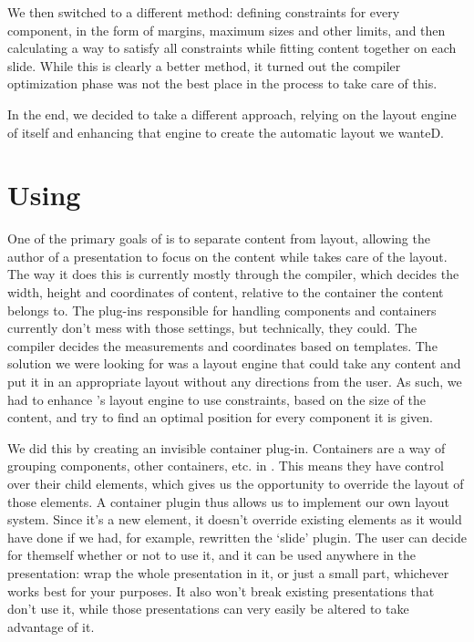    We then switched to a different method: defining constraints for every
   component, in the form of margins, maximum sizes and other limits, and then
   calculating a way to satisfy all constraints while fitting content together
   on each slide. While this is clearly a better method, it turned out the
   compiler optimization phase was not the best place in the process to take
   care of this.

   In the end, we decided to take a different approach, relying on the layout
   engine of \mxp itself and enhancing that engine to create the automatic
   layout we wanteD.

  \section{Using \mxp}

   One of the primary goals of \mxp is to separate content from layout,
   allowing the author of a presentation to focus on the content while \mxp
   takes care of the layout. The way it does this is currently mostly through
   the compiler, which decides the width, height and coordinates of content,
   relative to the container the content belongs to. The plug-ins responsible
   for handling components and containers currently don't mess with those
   settings, but technically, they could. The compiler decides the measurements
   and coordinates based on templates. The solution we were looking for was a
   layout engine that could take any content and put it in an appropriate
   layout without any directions from the user. As such, we had to enhance
   \mxp's layout engine to use constraints, based on the size of the content,
   and try to find an optimal position for every component it is given.

   We did this by creating an invisible container plug-in. Containers are a way
   of grouping components, other containers, etc. in \mxp. This means they have
   control over their child elements, which gives us the opportunity to
   override the layout of those elements. A container plugin thus allows us to
   implement our own layout system. Since it's a new element, it doesn't
   override existing elements as it would have done if we had, for example,
   rewritten the `slide' plugin. The user can decide for themself whether or
   not to use it, and it can be used anywhere in the presentation: wrap the
   whole presentation in it, or just a small part, whichever works best for
   your purposes. It also won't break existing presentations that don't use it,
   while those presentations can very easily be altered to take advantage of
   it.

